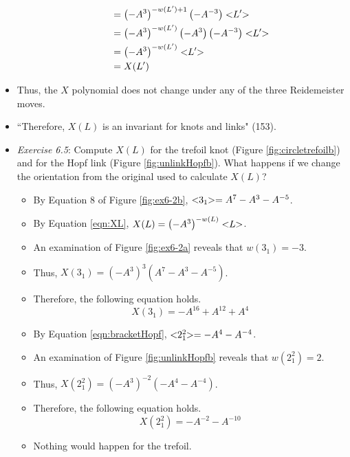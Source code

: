 \documentclass[titlepage]{article}
\numberwithin{figure}{section}
\numberwithin{table}{section}
\numberwithin{equation}{section}
\newcommand{\dq}[2]{``#1" (#2).}
\newcommand{\lbq}{<\hspace{-3pt}}
\newcommand{\rbq}{\hspace{-3pt}>}
\begin{document}
\begin{itemize}
\begin{itemize}
\begin{align*}
            &= \left( -A^3 \right)^{-w(L')+1}\left( -A^{-3} \right)\lbq L'\rbq\\
            &= \left( -A^3 \right)^{-w(L')}\left( -A^3 \right)\left( -A^{-3} \right)\lbq L'\rbq\\
            &= \left( -A^3 \right)^{-w(L')}\lbq L'\rbq\\
            &= X(L')
        \end{align*}
    \end{itemize}
    \item Thus, the $X$ polynomial does not change under any of the three Reidemeister moves.
    \item \dq{Therefore, $X(L)$ is an invariant for knots and links}{153}
    \item \emph{Exercise 6.5}: Compute $X(L)$ for the trefoil knot (Figure \ref{fig:circletrefoilb}) and for the Hopf link (Figure \ref{fig:unlinkHopfb}). What happens if we change the orientation from the original used to calculate $X(L)$?
    \begin{itemize}
        \item By Equation 8 of Figure \ref{fig:ex6-2b}, $\lbq 3_1\rbq=A^7-A^3-A^{-5}$.
        \item By Equation \ref{eqn:XL}, $X(L)=\left( -A^3 \right)^{-w(L)}\lbq L\rbq$.
        \item An examination of Figure \ref{fig:ex6-2a} reveals that $w\left( 3_1 \right)=-3$.
        \item Thus, $X\left( 3_1 \right)=\left( -A^3 \right)^{3}\left( A^7-A^3-A^{-5} \right)$.
        \item Therefore, the following equation holds.
        \begin{equation}\label{eqn:X31}
            X\left( 3_1 \right)=-A^{16}+A^{12}+A^4
        \end{equation}
        \item By Equation \ref{eqn:bracketHopf}, $\lbq 2^2_1\rbq=-A^4-A^{-4}$.
        \item An examination of Figure \ref{fig:unlinkHopfb} reveals that $w\left( 2^2_1 \right)=2$.
        \item Thus, $X\left( 2^2_1 \right)=\left( -A^3 \right)^{-2}\left( -A^4-A^{-4} \right)$.
        \item Therefore, the following equation holds.
        \begin{equation*}
            X\left( 2^2_1 \right)=-A^{-2}-A^{-10}
        \end{equation*}
        \item Nothing would happen for the trefoil.

\end{itemize}
\end{itemize}
\end{document}
